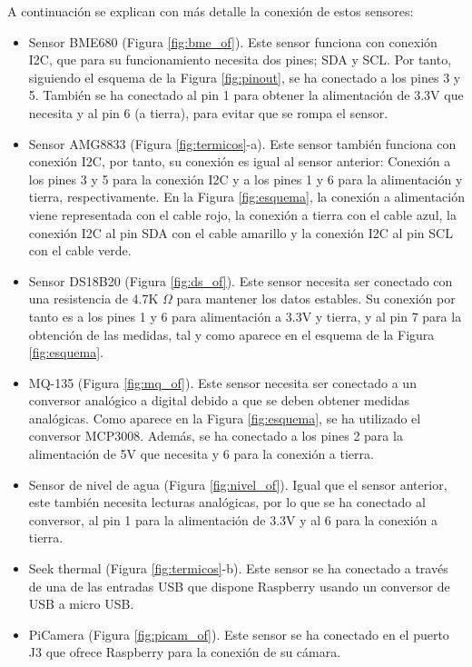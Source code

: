 A continuación se explican con más detalle la conexión de estos sensores:
\begin{itemize}
\item{Sensor BME680 (Figura \ref{fig:bme_of}).} Este sensor funciona con conexión I2C, que para su funcionamiento necesita dos pines; SDA y SCL. Por tanto, siguiendo el esquema de la Figura \ref{fig:pinout}, se ha conectado a los pines 3 y 5. También se ha conectado al pin 1 para obtener la alimentación de 3.3V que necesita y al pin 6 (a tierra), para evitar que se rompa el sensor.

\item{Sensor AMG8833 (Figura \ref{fig:termicos}-a).} Este sensor también funciona con conexión I2C, por tanto, su conexión es igual al sensor anterior: Conexión a los pines 3 y 5 para la conexión I2C y a los pines 1 y 6 para la alimentación y tierra, respectivamente. En la Figura \ref{fig:esquema}, la conexión a alimentación viene representada con el cable rojo, la conexión a tierra con el cable azul, la conexión I2C al pin SDA con el cable amarillo y la conexión I2C al pin SCL con el cable verde.

\item{Sensor DS18B20 (Figura \ref{fig:ds_of}).} Este sensor necesita ser conectado con una resistencia de 4.7K $\Omega$ para mantener los datos estables. Su conexión por tanto es a los pines 1 y 6 para alimentación a 3.3V y tierra, y al pin 7 para la obtención de las medidas, tal y como aparece en el esquema de la Figura \ref{fig:esquema}. 

\item{MQ-135 (Figura \ref{fig:mq_of}).} Este sensor necesita ser conectado a un conversor analógico a digital debido a que se deben obtener medidas analógicas. Como aparece en la Figura \ref{fig:esquema}, se ha utilizado el conversor MCP3008. Además, se ha conectado a los pines 2 para la alimentación de 5V que necesita y 6 para la conexión a tierra.

\item{Sensor de nivel de agua (Figura \ref{fig:nivel_of}).} Igual que el sensor anterior, este también necesita lecturas analógicas, por lo que se ha conectado al conversor, al pin 1 para la alimentación de 3.3V y al 6 para la conexión a tierra.

\item{Seek thermal (Figura \ref{fig:termicos}-b).} Este sensor se ha conectado a través de una de las entradas USB que dispone Raspberry usando un conversor de USB a micro USB.

\item{PiCamera (Figura \ref{fig:picam_of}).} Este sensor se ha conectado en el puerto J3 que ofrece Raspberry para la conexión de su cámara. 
\end{itemize}

